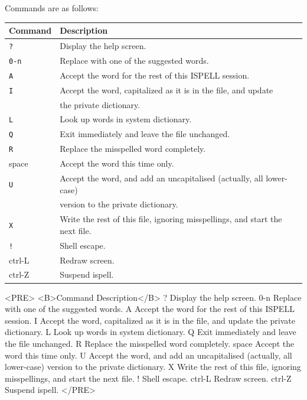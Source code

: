 \documentclass[twoside,11pt]{article}
\newenvironment{latexonly}{}{}
\begin{document}
Commands are as follows:

\begin{latexonly}
\begin{tabular}{ll}
Command & Description \\ \hline
{\tt ?    } & Display the help screen.\\
{\tt 0-n  } & Replace with one of the suggested words.\\
{\tt A    } & Accept the word for the rest of this ISPELL session.\\
{\tt I    } & Accept the word, capitalized as it is in the file, and update\\
            & the private dictionary.\\
{\tt L    } & Look up words in system dictionary.\\
{\tt Q    } & Exit immediately and leave the file unchanged.\\
{\tt R    } & Replace the misspelled word completely.\\
space       & Accept the word this time only.\\
{\tt U    } & Accept the word, and add an uncapitalised (actually, all
              lower-case)\\
            & version to the private dictionary.\\
{\tt X    } & Write the rest of this file, ignoring misspellings, and start the
              next file.\\
{\tt !    } & Shell escape.\\
ctrl-L      & Redraw screen.\\
ctrl-Z      & Suspend ispell.\\
\end{tabular}
\end{latexonly}
\begin{htmlonly}
\begin{rawhtml}
<PRE>
<B>Command   Description</B>
?         Display the help screen.
0-n       Replace with one of the suggested words.
A         Accept the word for the rest of this ISPELL session.
I         Accept the word, capitalized as it is in the file, and
          update the private dictionary.
L         Look up words in system dictionary.
Q         Exit immediately and leave the file unchanged.
R         Replace the misspelled word completely.
space     Accept the word this time only.
U         Accept the word, and add an uncapitalised (actually, all
          lower-case) version to the private dictionary.
X         Write the rest of this file, ignoring misspellings, and
          start the next file.
!         Shell escape.
ctrl-L    Redraw screen.
ctrl-Z    Suspend ispell.
</PRE>
\end{rawhtml}
\end{htmlonly}
\end{document}
